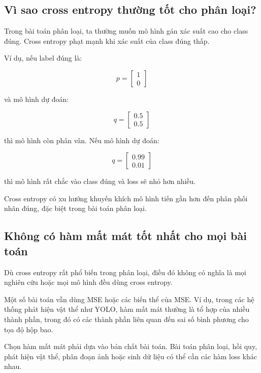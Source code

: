 \subsection{Vì sao cross entropy thường tốt cho phân loại?}

Trong bài toán phân loại, ta thường muốn mô hình gán xác suất cao cho class đúng. Cross entropy phạt mạnh khi xác suất của class đúng thấp.

Ví dụ, nếu label đúng là:

\[
    p =
    \begin{bmatrix}
    1\\0
    \end{bmatrix}
\]

và mô hình dự đoán:

\[
    q =
    \begin{bmatrix}
    0.5\\0.5
    \end{bmatrix}
\]

thì mô hình còn phân vân. Nếu mô hình dự đoán:

\[
    q =
    \begin{bmatrix}
    0.99\\0.01
    \end{bmatrix}
\]

thì mô hình rất chắc vào class đúng và loss sẽ nhỏ hơn nhiều.

\begin{ghinho}
Cross entropy có xu hướng khuyến khích mô hình tiến gần hơn đến phân phối nhãn đúng, đặc biệt trong bài toán phân loại.
\end{ghinho}

\subsection{Không có hàm mất mát tốt nhất cho mọi bài toán}

Dù cross entropy rất phổ biến trong phân loại, điều đó không có nghĩa là mọi nghiên cứu hoặc mọi mô hình đều dùng cross entropy.

Một số bài toán vẫn dùng MSE hoặc các biến thể của MSE. Ví dụ, trong các hệ thống phát hiện vật thể như YOLO, hàm mất mát thường là tổ hợp của nhiều thành phần, trong đó có các thành phần liên quan đến sai số bình phương cho tọa độ hộp bao.

\begin{luuy}
Chọn hàm mất mát phải dựa vào bản chất bài toán. Bài toán phân loại, hồi quy, phát hiện vật thể, phân đoạn ảnh hoặc sinh dữ liệu có thể cần các hàm loss khác nhau.
\end{luuy}

